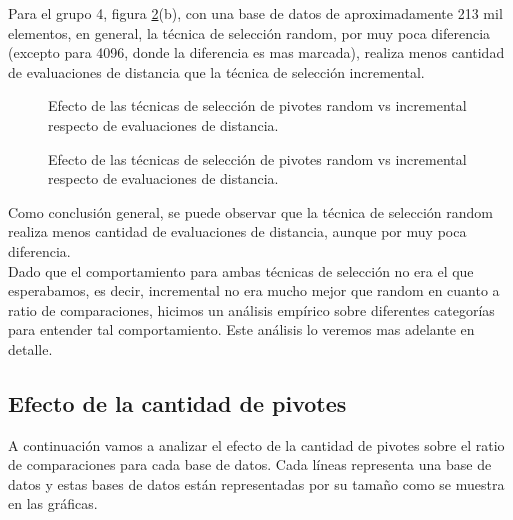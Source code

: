 Para el grupo 4, figura \ref{fig:ETS-2}(b), con una base de datos de aproximadamente 213 mil elementos, en general, la t\'ecnica de selecci\'on random, por muy poca diferencia (excepto para 4096, donde la diferencia es mas marcada), realiza menos cantidad de evaluaciones de distancia que la t\'ecnica de selecci\'on incremental.\\


\begin{figure}[H]
\centering
{}
\caption{\small Efecto de las t\'ecnicas de selecci\'on de pivotes random vs incremental respecto de evaluaciones de distancia.}
\label{fig:ETS-1}
\end{figure}
\begin{figure}[H]
\centering
{}
\caption{\small Efecto de las t\'ecnicas de selecci\'on de pivotes random vs incremental respecto de evaluaciones de distancia.}
\label{fig:ETS-2}

\end{figure}

Como conclusi\'on general, se puede observar que la t\'ecnica de selecci\'on random realiza menos cantidad de evaluaciones de distancia, aunque por muy poca diferencia.\\
 
Dado que el comportamiento para ambas t\'ecnicas de selecci\'on no era el que esperabamos, es decir, incremental no era mucho mejor que random en cuanto a ratio de comparaciones, hicimos un an\'alisis emp\'irico sobre diferentes categor\'ias para entender tal comportamiento. Este an\'alisis lo veremos mas adelante en detalle.

\subsection{Efecto de la cantidad de pivotes}

A continuaci\'on vamos a analizar el efecto de la cantidad de pivotes sobre el ratio de comparaciones para cada base de datos. Cada l\'ineas representa una base de datos y estas bases de datos est\'an representadas por su tamaño como se muestra en las gr\'aficas.\\

